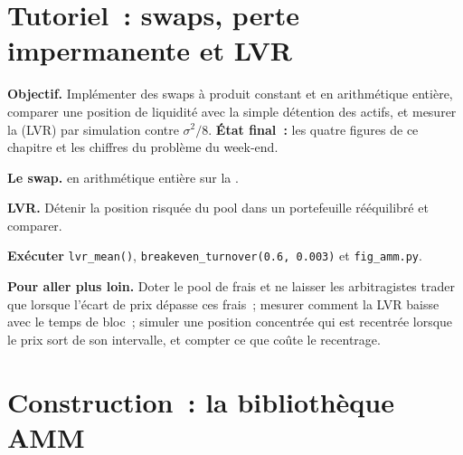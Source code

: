 \section{Tutoriel~: swaps, perte impermanente et LVR}\label{tut:m3:automated-market-makers:lvr}

\begin{tutorial}
\textbf{Objectif.} Implémenter des swaps à produit constant et  en arithmétique entière, comparer une position de liquidité avec la simple détention des actifs, et mesurer la 
(LVR) par simulation contre $\sigma^2/8$. \textbf{État final~:} les quatre figures de ce chapitre et les chiffres du problème du week-end.
\begin{tutsteps}
\item \textbf{Le swap.}  en arithmétique entière sur la .
\label{lst:m3:automated-market-makers:cp}
\item \textbf{LVR.} Détenir la position risquée du pool dans un portefeuille rééquilibré et comparer.
\label{lst:m3:automated-market-makers:lvr}
\item \textbf{Exécuter} \texttt{lvr\_mean()}, \texttt{breakeven\_turnover(0.6, 0.003)} et \texttt{fig\_amm.py}.
\end{tutsteps}
\textbf{Pour aller plus loin.} Doter le pool de frais et ne laisser les arbitragistes trader que lorsque l'écart de prix dépasse ces frais~; mesurer comment la LVR baisse avec le temps de bloc~;
simuler une position concentrée qui est recentrée lorsque le prix sort de son intervalle, et compter ce que coûte le recentrage.
\end{tutorial}

\section{Construction~: la bibliothèque AMM}\label{bld:m3:automated-market-makers:amm}

